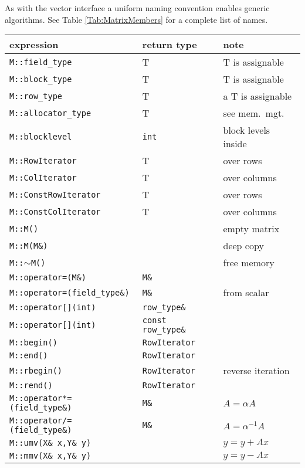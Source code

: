 \documentclass[11pt]{article}
\begin{document}
As with the vector interface a uniform naming convention enables
generic algorithms. See Table \ref{Tab:MatrixMembers} for a
complete list of names.
\begin{table}[htb]
\begin{center}
\begin{tabular}{|l|l|l|}
\hline
\textbf{expression} & \textbf{return type} & \textbf{note}\\
\hline
\hline
\texttt{M::field\_type} & T & T is assignable\\
\texttt{M::block\_type} & T & T is assignable\\
\texttt{M::row\_type} & T & a T is assignable\\
\texttt{M::allocator\_type} & T & see mem.~mgt.\\
\texttt{M::blocklevel} & \texttt{int} & block levels inside\\
\texttt{M::RowIterator} & T & over rows\\
\texttt{M::ColIterator} & T & over columns\\
\texttt{M::ConstRowIterator} & T & over rows\\
\texttt{M::ConstColIterator} & T & over columns\\
\hline
\texttt{M::M()} & & empty matrix \\
\texttt{M::M(M\&)} & & deep copy\\
\texttt{M::}$\sim$\texttt{M()} & & free memory\\
\texttt{M::operator=(M\&)} & \texttt{M\&} & \\
\texttt{M::operator=(field\_type\&)} & \texttt{M\&} & from scalar\\
\hline
\texttt{M::operator[](int)} & \texttt{row\_type\&} & \\
\texttt{M::operator[](int)} & \texttt{const row\_type\&} & \\
\texttt{M::begin()} & \texttt{RowIterator} & \\
\texttt{M::end()} & \texttt{RowIterator} & \\
\texttt{M::rbegin()} & \texttt{RowIterator} & reverse iteration\\
\texttt{M::rend()} & \texttt{RowIterator} & \\
\hline
\texttt{M::operator*=(field\_type\&)} & \texttt{M\&} & $A = \alpha A$\\
\texttt{M::operator/=(field\_type\&)} & \texttt{M\&} & $A = \alpha^{-1} A$\\
\hline
\texttt{M::umv(X\& x,Y\& y)}    &  & $y = y + Ax$\\
\texttt{M::mmv(X\& x,Y\& y)}    &  & $y = y - Ax$\\

\end{tabular}
\end{center}
\end{table}
\end{document}
